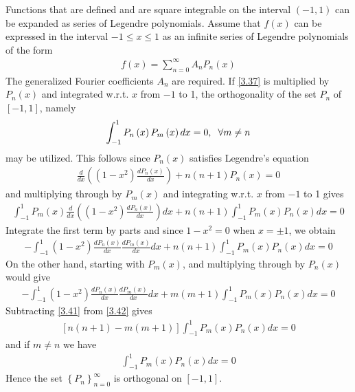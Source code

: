 \documentclass[a4paper]{article}
\numberwithin{equation}{section}
\begin{document}
Functions that are defined and are square integrable on the interval $\left(-1,1\right)$ can be expanded as series of Legendre polynomials. Assume that $f\left(x\right)$ can be expressed in the interval $-1\le x\le 1$ as an infinite series of Legendre polynomials of the form
\begin{align}
\label{3.37}
f\left( x \right) = \sum\limits_{n = 0}^\infty  {{A_n}{P_n}\left( x \right)} 
\end{align}
The generalized Fourier coefficients $A_n$ are required. If \eqref{3.37} is multiplied by $P_n\left(x\right)$ and integrated w.r.t. $x$ from $-1$ to 1, the orthogonality of the set $P_n$ of $\left[-1,1\right]$, namely
\begin{align}
\int_{ - 1}^1 {{P_n}\left( x \right){P_m}\left( x \right)dx}  = 0,\hspace{0.2cm}\forall m \ne n
\end{align}
may be utilized. This follows since $P_n\left(x\right)$ satisfies Legendre's equation
\begin{align}
\frac{d}{{dx}}\left( {\left( {1 - {x^2}} \right)\frac{{d{P_n}\left( x \right)}}{{dx}}} \right) + n\left( {n + 1} \right){P_n}\left( x \right) = 0
\end{align}
and multiplying through by $P_m\left(x\right)$ and integrating w.r.t. $x$ from $-1$ to 1 gives
\begin{align}
\int_{ - 1}^1 {{P_m}\left( x \right)\frac{d}{{dx}}\left( {\left( {1 - {x^2}} \right)\frac{{d{P_n}\left( x \right)}}{{dx}}} \right)dx}  + n\left( {n + 1} \right)\int_{ - 1}^1 {{P_m}\left( x \right){P_n}\left( x \right)dx}  = 0
\end{align}
Integrate the first term by parts and since $1-x^2=0$ when $x=\pm 1$, we obtain
\begin{align}
\label{3.41}
 - \int_{ - 1}^1 {\left( {1 - {x^2}} \right)\frac{{d{P_n}\left( x \right)}}{{dx}}\frac{{d{P_m}\left( x \right)}}{{dx}}dx}  + n\left( {n + 1} \right)\int_{ - 1}^1 {{P_m}\left( x \right){P_n}\left( x \right)dx}  = 0
\end{align}
On the other hand, starting with $P_m\left(x\right)$, and multiplying through by $P_n\left(x\right)$ would give
\begin{align}
\label{3.42}
 - \int_{ - 1}^1 {\left( {1 - {x^2}} \right)\frac{{d{P_n}\left( x \right)}}{{dx}}\frac{{d{P_m}\left( x \right)}}{{dx}}dx}  + m\left( {m + 1} \right)\int_{ - 1}^1 {{P_m}\left( x \right){P_n}\left( x \right)dx}  = 0
\end{align}
Subtracting \eqref{3.41} from \eqref{3.42} gives
\begin{align}
\left[ {n\left( {n + 1} \right) - m\left( {m + 1} \right)} \right]\int_{ - 1}^1 {{P_m}\left( x \right){P_n}\left( x \right)dx}  = 0
\end{align}
and if $m\ne n$ we have
\begin{align}
\int_{ - 1}^1 {{P_m}\left( x \right){P_n}\left( x \right)dx}  = 0
\end{align}
Hence the set $\left\{ {{P_n}} \right\}_{n = 0}^\infty $  is orthogonal on $\left[-1,1\right]$.
\end{document}
